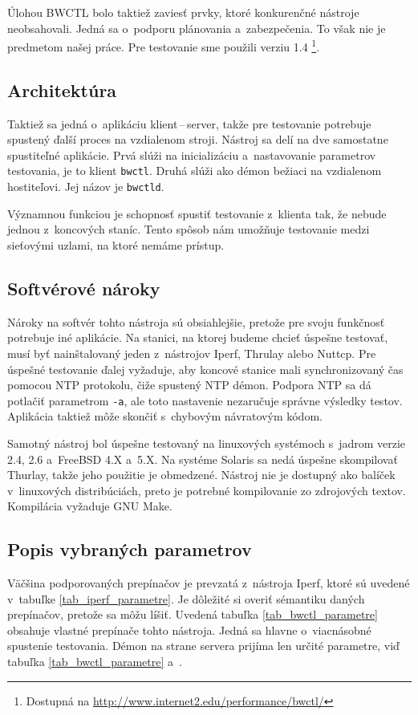     Úlohou BWCTL bolo taktiež zaviesť prvky, ktoré konkurenčné nástroje
    neobsahovali. Jedná sa o~podporu plánovania a~zabezpečenia. To však nie je 
    predmetom našej práce.
    Pre testovanie sme použili verziu 1.4
    \footnote{Dostupná na \url{http://www.internet2.edu/performance/bwctl/}}.

        \subsection{Architektúra}\label{bwctl_arch}
        Taktiež sa jedná o~aplikáciu klient\,--\,server, takže pre testovanie
        potrebuje spustený ďalší proces na vzdialenom stroji.
        Nástroj sa delí na dve samostatne spustiteľné aplikácie. Prvá slúži na 
        inicializáciu a~nastavovanie parametrov testovania, je to klient
        \texttt{bwctl}.
        Druhá slúži ako
        démon bežiaci na vzdialenom hostiteľovi. Jej názov je \texttt{bwctld}.

        Významnou funkciou je schopnosť spustiť testovanie z~klienta tak, že
        nebude jednou z~koncových staníc. Tento spôsob nám umožňuje
        testovanie medzi sieťovými uzlami, na ktoré nemáme prístup.

        \subsection{Softvérové nároky} \label{bwctl_sw}
        Nároky na softvér tohto nástroja sú obsiahlejšie, pretože pre svoju
        funkčnosť potrebuje iné aplikácie.
        Na stanici, na ktorej budeme chcieť úspešne testovať, musí byť
        nainštalovaný jeden z~nástrojov Iperf, Thrulay alebo Nuttcp.
        Pre úspešné testovanie ďalej vyžaduje, aby koncové stanice mali synchronizovaný
        čas pomocou NTP protokolu, čiže spustený NTP démon.
        Podpora NTP sa dá potlačiť parametrom \texttt{-a}, ale toto
        nastavenie nezaručuje správne výsledky testov. Aplikácia taktiež môže
        skončiť s~chybovým návratovým kódom. 

        Samotný nástroj bol úspešne testovaný na linuxových systémoch 
        s~jadrom verzie 2.4, 2.6 a~FreeBSD 4.X a~5.X.  
        Na systéme Solaris sa nedá úspešne skompilovať Thurlay, takže jeho
        použitie je obmedzené.
        Nástroj nie je dostupný ako balíček v~linuxových distribúciách, preto je 
        potrebné kompilovanie zo zdrojových textov. Kompilácia vyžaduje
        GNU Make.

        \subsection{Popis vybraných parametrov} \label{bwctl_param}
        Väčšina podporovaných prepínačov je prevzatá z~nástroja Iperf,
        ktoré sú uvedené v~tabuľke \ref{tab_iperf_parametre}. Je dôležité si overiť 
        sémantiku  daných prepínačov, pretože sa môžu líšiť.
        Uvedená tabuľka \ref{tab_bwctl_parametre} obsahuje vlastné 
        prepínače tohto nástroja. Jedná sa hlavne o~viacnásobné
        spustenie testovania.
        Démon na strane servera prijíma len určité parametre, viď tabuľka 
        \ref{tab_bwctl_parametre} a~\cite{bwctld_manual}.


